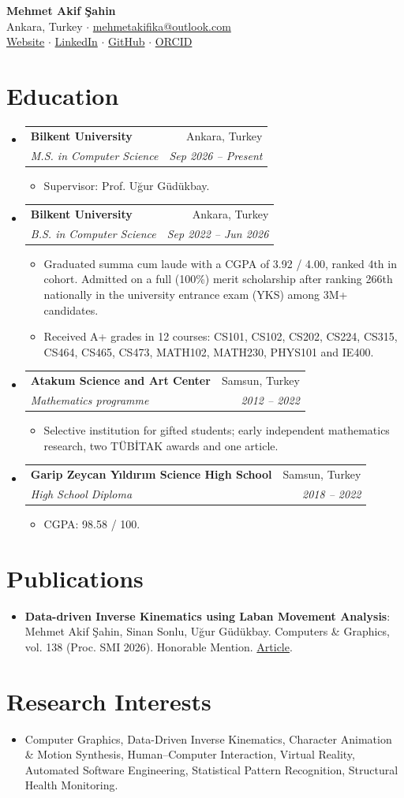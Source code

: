 \documentclass[letterpaper,11pt]{article}
\makeatletter
\newcommand{\resumeItem}[2]{
  \item\small{
    \textbf{#1}{: #2 \vspace{-2pt}}
  }
}
\newcommand{\resumeItemTitleless}[1]{
  \item\small{
    {#1 \vspace{-2pt}}
  }
}
\newcommand{\resumeSubheading}[4]{
  \vspace{-1pt}\item
    \begin{tabular*}{0.97\textwidth}{l@{\extracolsep{\fill}}r}
      \textbf{#1} & #2 \\
      \textit{\small#3} & \textit{\small #4} \\
    \end{tabular*}\vspace{-5pt}
}
\newcommand{\resumeSubHeadingListStart}{\begin{itemize}[leftmargin=*]}
\newcommand{\resumeSubHeadingListEnd}{\end{itemize}}
\newcommand{\resumeItemListStart}{\begin{itemize}}
\newcommand{\resumeItemListEnd}{\end{itemize}\vspace{-5pt}}
\makeatother
\begin{document}
\begin{center}
{\Large\textbf{Mehmet Akif Şahin}}\\[3pt]
\small Ankara, Turkey $\cdot$ \href{mailto:mehmetakifika@outlook.com}{mehmetakifika@outlook.com}\\[3pt]
\href{https://mehmetakifsahin.com/}{Website} $\cdot$ \href{https://www.linkedin.com/in/akif123/}{LinkedIn} $\cdot$ \href{https://github.com/afikbae}{GitHub} $\cdot$ \href{https://orcid.org/0000-0002-5876-7787}{ORCID}
\end{center}
\section{Education}
\resumeSubHeadingListStart
\resumeSubheading{Bilkent University}{Ankara, Turkey}{M.S. in Computer Science}{Sep 2026 -- Present}
\resumeItemListStart
\resumeItemTitleless{Supervisor: Prof. Uğur Güdükbay.}
\resumeItemListEnd
\resumeSubheading{Bilkent University}{Ankara, Turkey}{B.S. in Computer Science}{Sep 2022 -- Jun 2026}
\resumeItemListStart
\resumeItemTitleless{Graduated summa cum laude with a CGPA of 3.92 / 4.00, ranked 4th in cohort. Admitted on a full (100\%) merit scholarship after ranking 266th nationally in the university entrance exam (YKS) among 3M+ candidates.}
\resumeItemTitleless{Received A+ grades in 12 courses: CS101, CS102, CS202, CS224, CS315, CS464, CS465, CS473, MATH102, MATH230, PHYS101 and IE400.}
\resumeItemListEnd
\resumeSubheading{Atakum Science and Art Center}{Samsun, Turkey}{Mathematics programme}{2012 -- 2022}
\resumeItemListStart
\resumeItemTitleless{Selective institution for gifted students; early independent mathematics research, two TÜBİTAK awards and one article.}
\resumeItemListEnd
\resumeSubheading{Garip Zeycan Yıldırım Science High School}{Samsun, Turkey}{High School Diploma}{2018 -- 2022}
\resumeItemListStart
\resumeItemTitleless{CGPA: 98.58 / 100.}
\resumeItemListEnd
\resumeSubHeadingListEnd
\section{Publications}
\resumeSubHeadingListStart
\resumeItem{Data-driven Inverse Kinematics using Laban Movement Analysis}{Mehmet Akif Şahin, Sinan Sonlu, Uğur Güdükbay. Computers \& Graphics, vol. 138 (Proc. SMI 2026). Honorable Mention. \href{https://doi.org/10.1016/j.cag.2026.104643}{Article}.}
\resumeSubHeadingListEnd
\section{Research Interests}
\resumeSubHeadingListStart
\resumeItemTitleless{Computer Graphics, Data-Driven Inverse Kinematics, Character Animation \& Motion Synthesis, Human--Computer Interaction, Virtual Reality, Automated Software Engineering, Statistical Pattern Recognition, Structural Health Monitoring.}
\resumeSubHeadingListEnd
\newpage
\end{document}
